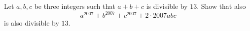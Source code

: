 Let $a,b,c$ be three integers such that $a+b+c$ is divisible by $13$. Show that also 
$$a^{2007}+b^{2007}+c^{2007}+2\cdot 2007 abc$$
is also divisible by $13$.
